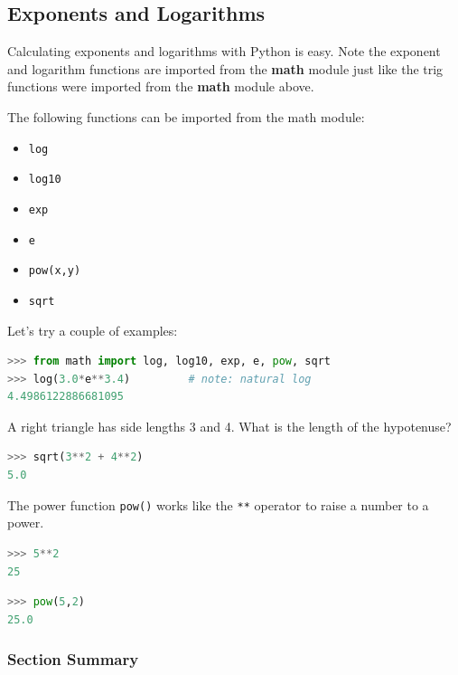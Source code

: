 \documentclass{book}
\providecommand{\tightlist}{%
      \setlength{\itemsep}{0pt}\setlength{\parskip}{0pt}}
\begin{document}
    
        \subsection{Exponents and Logarithms}\label{exponents-and-logarithms}

Calculating exponents and logarithms with Python is easy. Note the
exponent and logarithm functions are imported from the \textbf{math}
module just like the trig functions were imported from the \textbf{math}
module above.

The following functions can be imported from the math module:

\begin{itemize}
\tightlist
\item
  \lstinline!log!
\item
  \lstinline!log10!
\item
  \lstinline!exp!
\item
  \lstinline!e!
\item
  \lstinline!pow(x,y)!
\item
  \lstinline!sqrt!
\end{itemize}

Let's try a couple of examples:

\begin{lstlisting}[language=Python]
>>> from math import log, log10, exp, e, pow, sqrt
>>> log(3.0*e**3.4)         # note: natural log
4.4986122886681095
\end{lstlisting}

A right triangle has side lengths 3 and 4. What is the length of the
hypotenuse?

\begin{lstlisting}[language=Python]
>>> sqrt(3**2 + 4**2)
5.0 
\end{lstlisting}

The power function \lstinline!pow()! works like the \lstinline!**!
operator to raise a number to a power.

\begin{lstlisting}[language=Python]
>>> 5**2
25
\end{lstlisting}

\begin{lstlisting}[language=Python]
>>> pow(5,2)
25.0
\end{lstlisting}

\subsubsection{Section Summary}\label{section-summary}
\end{document}
